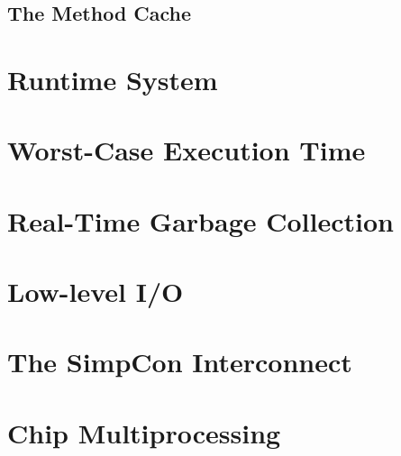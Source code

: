 \clearpage
    \section{The Method Cache}
    \label{sec:cache}
    

\chapter{Runtime System}
\label{chap:runtime}

    
    
%    
    
\clearpage
    
    

\chapter{Worst-Case Execution Time}
\label{chap:wcet}
    

\chapter{Real-Time Garbage Collection}
\label{chap:rtgc}
    

\chapter{Low-level I/O}
\label{chap:io}
    

\chapter{The SimpCon Interconnect}
\label{chap:simpcon}
\newcommand{\scgrsc}{0.72}
\newcommand{\scgrp}{simpcon}




\chapter{Chip Multiprocessing}
\label{chap:cmp}



%

